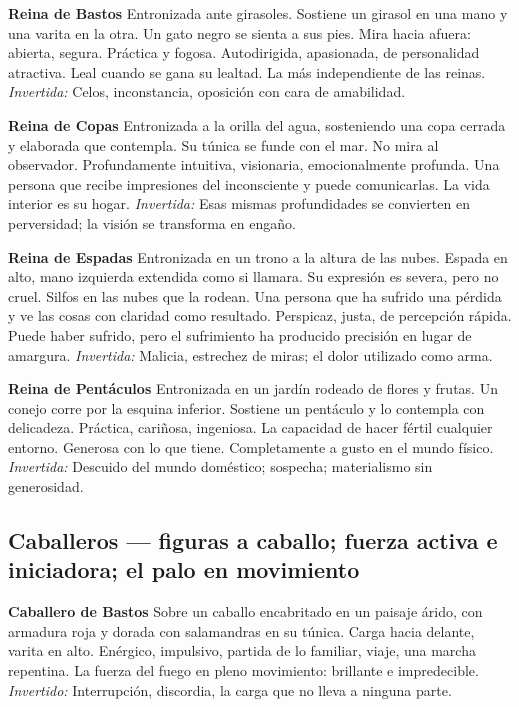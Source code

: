 \textbf{Reina de Bastos} Entronizada ante girasoles. Sostiene un girasol en una mano y una varita en la otra. Un gato negro se sienta a sus pies. Mira hacia afuera: abierta, segura. Práctica y fogosa. Autodirigida, apasionada, de personalidad atractiva. Leal cuando se gana su lealtad. La más independiente de las reinas. \emph{Invertida:} Celos, inconstancia, oposición con cara de amabilidad.

\textbf{Reina de Copas} Entronizada a la orilla del agua, sosteniendo una copa cerrada y elaborada que contempla. Su túnica se funde con el mar. No mira al observador. Profundamente intuitiva, visionaria, emocionalmente profunda. Una persona que recibe impresiones del inconsciente y puede comunicarlas. La vida interior es su hogar. \emph{Invertida:} Esas mismas profundidades se convierten en perversidad; la visión se transforma en engaño.

\textbf{Reina de Espadas} Entronizada en un trono a la altura de las nubes. Espada en alto, mano izquierda extendida como si llamara. Su expresión es severa, pero no cruel. Silfos en las nubes que la rodean. Una persona que ha sufrido una pérdida y ve las cosas con claridad como resultado. Perspicaz, justa, de percepción rápida. Puede haber sufrido, pero el sufrimiento ha producido precisión en lugar de amargura. \emph{Invertida:} Malicia, estrechez de miras; el dolor utilizado como arma.

\textbf{Reina de Pentáculos} Entronizada en un jardín rodeado de flores y frutas. Un conejo corre por la esquina inferior. Sostiene un pentáculo y lo contempla con delicadeza. Práctica, cariñosa, ingeniosa. La capacidad de hacer fértil cualquier entorno. Generosa con lo que tiene. Completamente a gusto en el mundo físico. \emph{Invertida:} Descuido del mundo doméstico; sospecha; materialismo sin generosidad.

\subsection{Caballeros --- figuras a caballo; fuerza activa e iniciadora; el palo en movimiento}\label{knights--mounted-figures-active-initiating-force-the-suit-in-motion}

\textbf{Caballero de Bastos} Sobre un caballo encabritado en un paisaje árido, con armadura roja y dorada con salamandras en su túnica. Carga hacia delante, varita en alto. Enérgico, impulsivo, partida de lo familiar, viaje, una marcha repentina. La fuerza del fuego en pleno movimiento: brillante e impredecible. \emph{Invertido:} Interrupción, discordia, la carga que no lleva a ninguna parte.

